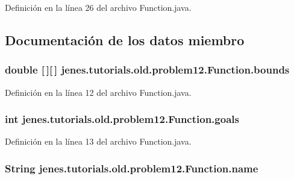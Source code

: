 Definición en la línea 26 del archivo Function.\-java.



\subsection{Documentación de los datos miembro}
\hypertarget{classjenes_1_1tutorials_1_1old_1_1problem12_1_1_function_a0a732b2084fd09b6d69858b21a780a05}{
\subsubsection[{bounds}]{\setlength{\rightskip}{0pt plus 5cm}double \mbox{[}$\,$\mbox{]}\mbox{[}$\,$\mbox{]} jenes.\-tutorials.\-old.\-problem12.\-Function.\-bounds\hspace{0.3cm}{\ttfamily [protected]}}}\label{classjenes_1_1tutorials_1_1old_1_1problem12_1_1_function_a0a732b2084fd09b6d69858b21a780a05}


Definición en la línea 12 del archivo Function.\-java.

\hypertarget{classjenes_1_1tutorials_1_1old_1_1problem12_1_1_function_a9ad846e268721b5a9d5d3e15763d5400}{
\subsubsection[{goals}]{\setlength{\rightskip}{0pt plus 5cm}int jenes.\-tutorials.\-old.\-problem12.\-Function.\-goals\hspace{0.3cm}{\ttfamily [protected]}}}\label{classjenes_1_1tutorials_1_1old_1_1problem12_1_1_function_a9ad846e268721b5a9d5d3e15763d5400}


Definición en la línea 13 del archivo Function.\-java.

\hypertarget{classjenes_1_1tutorials_1_1old_1_1problem12_1_1_function_a6cc32f98e4932a3251cbaffdf08b9773}{
\subsubsection[{name}]{\setlength{\rightskip}{0pt plus 5cm}String jenes.\-tutorials.\-old.\-problem12.\-Function.\-name\hspace{0.3cm}{\ttfamily [protected]}}}\label{classjenes_1_1tutorials_1_1old_1_1problem12_1_1_function_a6cc32f98e4932a3251cbaffdf08b9773}


